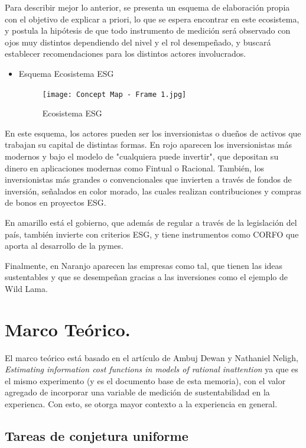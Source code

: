 \documentclass[11pt,letterpaper]{article}
\begin{document}
Para describir mejor lo anterior, se presenta un esquema de elaboración propia con el objetivo de explicar a priori, lo que se espera encontrar en este ecosistema, y postula la hipótesis de que todo instrumento de medición será observado con ojos muy distintos dependiendo del nivel y el rol desempeñado, y buscará establecer recomendaciones para los distintos actores involucrados.

\begin{itemize}
    \item Esquema Ecosistema ESG
        \begin{figure}[h]
            \centering
            \texttt{[image: Concept Map - Frame 1.jpg]}
            \caption{Ecosistema ESG}
        \end{figure}
\end{itemize}

En este esquema, los actores pueden ser los inversionistas o dueños de activos que trabajan su capital de distintas formas. En rojo aparecen los inversionistas más modernos y bajo el modelo de "cualquiera puede invertir", que depositan su dinero en aplicaciones modernas como Fintual o Racional. También, los inversionistas más grandes o convencionales que invierten a través de fondos de inversión, señalados en color morado, las cuales realizan contribuciones y compras de bonos en proyectos ESG.

En amarillo está el gobierno, que además de regular a través de la legislación del país, también invierte con criterios ESG, y tiene instrumentos como CORFO que aporta al desarrollo de la pymes. 

Finalmente, en Naranjo aparecen las empresas como tal, que tienen las ideas sustentables y que se desempeñan gracias a las inversiones como el ejemplo de Wild Lama.



\section{Marco Teórico.}

El marco teórico está basado en el artículo de Ambuj Dewan y Nathaniel Neligh, \textit{Estimating information cost functions in models of rational inattention} ya que es el mismo experimento (y es el documento base de esta memoria), con el valor agregado de incorporar una variable de medición de sustentabilidad en la experienca. Con esto, se otorga mayor contexto a la experiencia en general.

\subsection{Tareas de conjetura uniforme}
\end{document}
